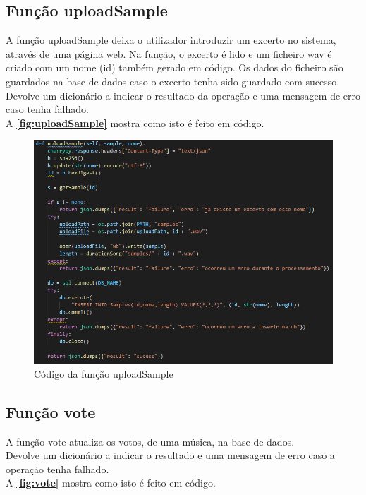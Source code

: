 \documentclass{report}
\begin{document}
\subsection{Função uploadSample}
\label{ssec:uploadSample}
A função uploadSample deixa o utilizador introduzir um excerto no sistema, através de uma página web.
Na função, o excerto é lido e um ficheiro wav é criado com um nome (id) também gerado em código.
Os dados do ficheiro são guardados na base de dados caso o excerto tenha sido guardado com sucesso.\\
Devolve um dicionário a indicar o resultado da operação e uma mensagem de erro caso tenha falhado.\\
A \textbf{\autoref{fig:uploadSample}} mostra como isto é feito em código.

\begin{figure}[!h]
\center 
\includegraphics[width=330pt]{img/uploadSample.png}
\caption{Código da função uploadSample}
\label{fig:uploadSample}
\end{figure}

\subsection{Função vote}
\label{ssec:vote}
A função vote atualiza os votos, de uma música, na base de dados.\\
Devolve um dicionário a indicar o resultado e uma mensagem de erro caso a operação tenha falhado.\\
A \textbf{\autoref{fig:vote}} mostra como isto é feito em código.
\end{document}
